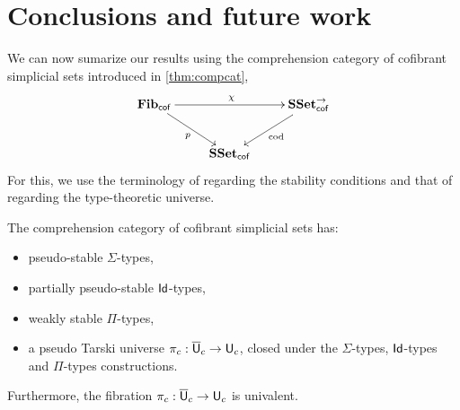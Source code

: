 \documentclass[reqno,10pt,a4paper,oneside,draft]{amsart}
\begin{document}
\section{Conclusions and future work}
\label{sec:conclusion}

We can now sumarize our results using the comprehension category of cofibrant simplicial sets introduced in \cref{thm:compcat}, 
\[ 
\xymatrix{
\mathbf{Fib}_{ \mathsf{cof}} \ar[dr]_{p} \ar[rr]^{\chi} & & \SSet^{\to}_{\mathsf{cof}} \ar[dl]^{\mathrm{cod}} \\ 
 & \SSet_{\mathsf{cof}} &  }
 \]
For this, we use the terminology of \cite{LumsdaineP:locuoc} regarding the stability conditions and
that of  \cite[Appendix~A]{ShulmanM:allths}  regarding the type-theoretic universe.

\begin{theorem} \label{th:main_ContextualCat} The comprehension category of cofibrant simplicial sets has:
\begin{itemize}
\item pseudo-stable $\Sigma$-types,
\item partially pseudo-stable $\mathsf{Id}$-types,
\item weakly stable $\Pi$-types,
\item a pseudo Tarski universe $\pi_c: \overline{\mathsf{U}}_c \rightarrow \mathsf{U}_c$, closed under the $\Sigma$-types, $\mathsf{Id}$-types and $\Pi$-types constructions.
\end{itemize}
Furthermore, the fibration $\pi_c: \overline{\mathsf{U}}_c \rightarrow \mathsf{U}_c $ is univalent.
\end{theorem}
\end{document}
